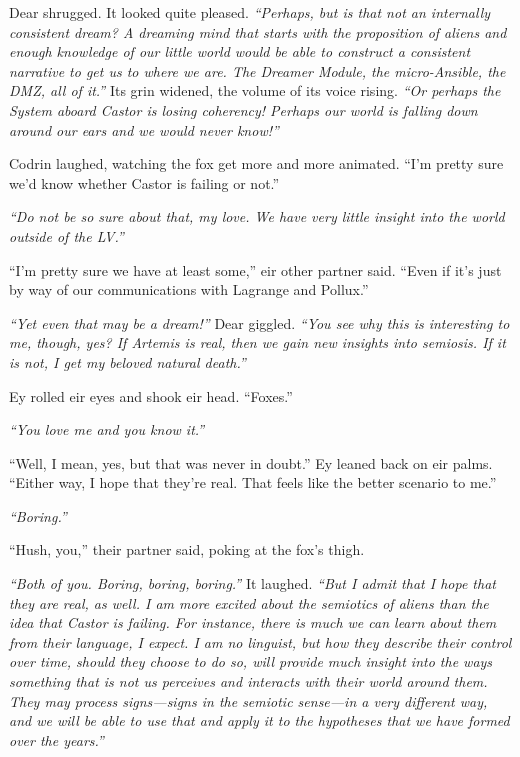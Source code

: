 Dear shrugged. It looked quite pleased. \emph{``Perhaps, but is that not an internally consistent dream? A dreaming mind that starts with the proposition of aliens and enough knowledge of our little world would be able to construct a consistent narrative to get us to where we are. The Dreamer Module, the micro-Ansible, the DMZ, all of it.''} Its grin widened, the volume of its voice rising. \emph{``Or perhaps the System aboard Castor is losing coherency! Perhaps our world is falling down around our ears and we would never know!''}

Codrin laughed, watching the fox get more and more animated. ``I'm pretty sure we'd know whether Castor is failing or not.''

\emph{``Do not be so sure about that, my love. We have very little insight into the world outside of the LV.''}

``I'm pretty sure we have at least some,'' eir other partner said. ``Even if it's just by way of our communications with Lagrange and Pollux.''

\emph{``Yet even that may be a dream!''} Dear giggled. \emph{``You see why this is interesting to me, though, yes? If Artemis is real, then we gain new insights into semiosis. If it is not, I get my beloved natural death.''}

Ey rolled eir eyes and shook eir head. ``Foxes.''

\emph{``You love me and you know it.''}

``Well, I mean, yes, but that was never in doubt.'' Ey leaned back on eir palms. ``Either way, I hope that they're real. That feels like the better scenario to me.''

\emph{``Boring.''}

``Hush, you,'' their partner said, poking at the fox's thigh.

\emph{``Both of you. Boring, boring, boring.''} It laughed. \emph{``But I admit that I hope that they are real, as well. I am more excited about the semiotics of aliens than the idea that Castor is failing. For instance, there is much we can learn about them from their language, I expect. I am no linguist, but how they describe their control over time, should they choose to do so, will provide much insight into the ways something that is not us perceives and interacts with their world around them. They may process signs—signs in the semiotic sense—in a very different way, and we will be able to use that and apply it to the hypotheses that we have formed over the years.''}

